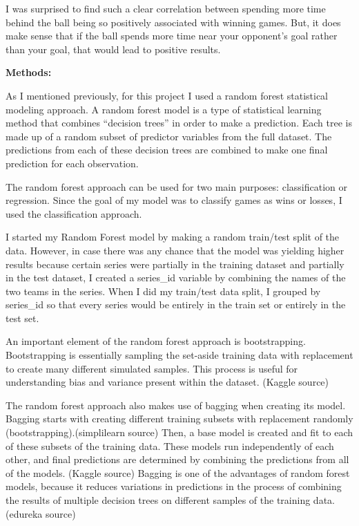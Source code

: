 \documentclass[
  letterpaper,
  DIV=11,
  numbers=noendperiod]{scrartcl}
\begin{document}
I was surprised to find such a clear correlation between spending more
time behind the ball being so positively associated with winning games.
But, it does make sense that if the ball spends more time near your
opponent's goal rather than your goal, that would lead to positive
results.

\textbf{Methods:}

As I mentioned previously, for this project I used a random forest
statistical modeling approach. A random forest model is a type of
statistical learning method that combines ``decision trees'' in order to
make a prediction. Each tree is made up of a random subset of predictor
variables from the full dataset. The predictions from each of these
decision trees are combined to make one final prediction for each
observation.

The random forest approach can be used for two main purposes:
classification or regression. Since the goal of my model was to classify
games as wins or losses, I used the classification approach.

I started my Random Forest model by making a random train/test split of
the data. However, in case there was any chance that the model was
yielding higher results because certain series were partially in the
training dataset and partially in the test dataset, I created a
series\_id variable by combining the names of the two teams in the
series. When I did my train/test data split, I grouped by series\_id so
that every series would be entirely in the train set or entirely in the
test set.

An important element of the random forest approach is bootstrapping.
Bootstrapping is essentially sampling the set-aside training data with
replacement to create many different simulated samples. This process is
useful for understanding bias and variance present within the dataset.
(Kaggle source)

The random forest approach also makes use of bagging when creating its
model. Bagging starts with creating different training subsets with
replacement randomly (bootstrapping).(simplilearn source) Then, a base
model is created and fit to each of these subsets of the training data.
These models run independently of each other, and final predictions are
determined by combining the predictions from all of the models. (Kaggle
source) Bagging is one of the advantages of random forest models,
because it reduces variations in predictions in the process of combining
the results of multiple decision trees on different samples of the
training data. (edureka source)
\end{document}
